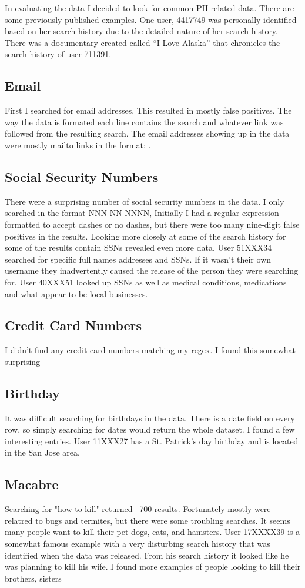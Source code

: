 \documentclass{article}
\begin{document}
In evaluating the data I decided to look for common PII related data. There are some previously published examples. One user, 4417749 was personally identified based on her search history due to the detailed nature of her search history\cite{citation neede}. There was a documentary created called “I Love Alaska” that chronicles the search history of user 711391\cite{imdb}.
\subsection{Email}
First I searched for email addresses. This resulted in mostly false positives. The way the data is formated each line contains the search and whatever link was followed from the resulting search. The email addresses showing up in the data were mostly mailto links in the format: .
\subsection{Social Security Numbers}
There were a surprising number of social security numbers in the data. I only searched in the format NNN-NN-NNNN, Initially I had a regular expression formatted to accept dashes or no dashes, but there were too many nine-digit false positives in the results.
Looking more closely at some of the search history for some of the results contain SSNs revealed even more data. User 51XXX34 searched for  specific full names addresses and SSNs. If it wasn’t their own username they inadvertently caused the release of the person they were searching for. User 40XXX51 looked up SSNs as well as medical conditions, medications and what appear to be local businesses.
\subsection{Credit Card Numbers}
I didn’t find any credit card numbers matching my regex. I found this somewhat surprising
\subsection{Birthday}
It was difficult searching for birthdays in the data. There is a date field on every row, so simply searching for dates would return the whole dataset. I found a few interesting entries. User 11XXX27 has a St. Patrick’s day birthday and is located in the San Jose area.
\subsection{Macabre}
Searching for "how to kill" returned ~700 results. Fortunately mostly were relatred to bugs and termites, but there were some troubling searches. It seems many people want to kill their pet dogs, cats, and hamsters. User 17XXXX39 is a somewhat famous example\cite{murder} with a very disturbing search history that was identified when the data was released. From his search history it looked like he was planning to kill his wife. I found more examples of people looking to kill their brothers, sisters
\end{document}
